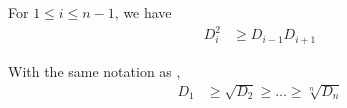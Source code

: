 \documentclass{subfile}
\begin{document}
		\begin{theorem}\label{thm:newton}
			For $1\leq i\leq n-1$, we have
				\begin{align*}
					D_{i}^{2}
						& \geq D_{i-1}D_{i+1}
				\end{align*}
		\end{theorem}

		\begin{theorem}\label{thm:maclaurin}
			With the same notation as ,
				\begin{align*}
					D_{1}
						& \geq \sqrt{D_{2}}\geq\ldots\geq\sqrt[n]{D_{n}}
				\end{align*}
		\end{theorem}
\end{document}
